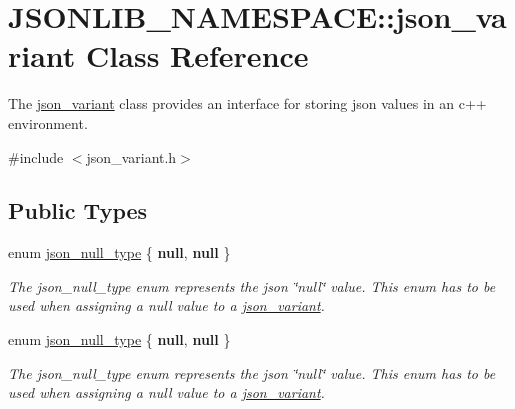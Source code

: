 \hypertarget{classJSONLIB__NAMESPACE_1_1json__variant}{}\section{J\+S\+O\+N\+L\+I\+B\+\_\+\+N\+A\+M\+E\+S\+P\+A\+CE\+:\+:json\+\_\+variant Class Reference}
\label{classJSONLIB__NAMESPACE_1_1json__variant}


The \hyperlink{classJSONLIB__NAMESPACE_1_1json__variant}{json\+\_\+variant} class provides an interface for storing json values in an c++ environment.  




{\ttfamily \#include $<$json\+\_\+variant.\+h$>$}

\subsection*{Public Types}
\begin{DoxyCompactItemize}
\item 
enum \hyperlink{classJSONLIB__NAMESPACE_1_1json__variant_a1251d2c28258eeebea991ed0b39c3e0c}{json\+\_\+null\+\_\+type} \{ {\bfseries null}, 
{\bfseries null}
 \}\begin{DoxyCompactList}\small\item\em The json\+\_\+null\+\_\+type enum represents the json \char`\"{}null\char`\"{} value. This enum has to be used when assigning a null value to a \hyperlink{classJSONLIB__NAMESPACE_1_1json__variant}{json\+\_\+variant}. \end{DoxyCompactList}
\item 
enum \hyperlink{classJSONLIB__NAMESPACE_1_1json__variant_a1251d2c28258eeebea991ed0b39c3e0c}{json\+\_\+null\+\_\+type} \{ {\bfseries null}, 
{\bfseries null}
 \}\begin{DoxyCompactList}\small\item\em The json\+\_\+null\+\_\+type enum represents the json \char`\"{}null\char`\"{} value. This enum has to be used when assigning a null value to a \hyperlink{classJSONLIB__NAMESPACE_1_1json__variant}{json\+\_\+variant}. \end{DoxyCompactList}
\end{DoxyCompactItemize}
